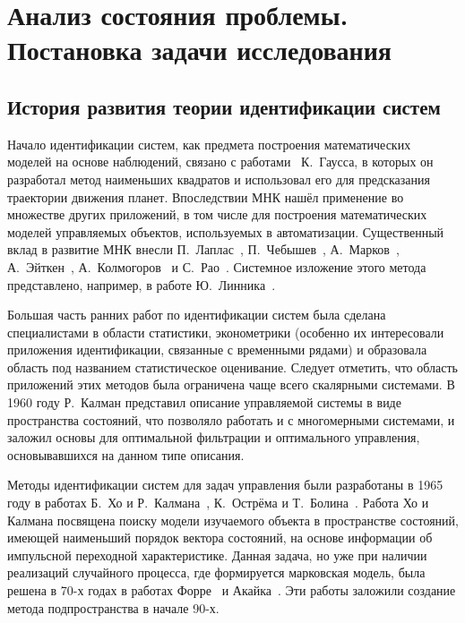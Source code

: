\chapter[Анализ состояния проблемы. Постановка задачи исследования]{%
  Анализ состояния проблемы. \hspace{2cm}
  Постановка задачи исследования
}

\section[История развития теории идентификации систем]{%
  История развития теории идентификации систем
}

Начало идентификации систем, как предмета построения математических моделей на основе наблюдений,
связано с работами~\cite{gauss_1809, gauss_1810, gauss_1821} К.~Гаусса,
в которых он разработал метод наименьших квадратов и использовал его для предсказания
траектории движения планет.
Впоследствии МНК нашёл применение во множестве других приложений,
в том числе для построения математических моделей управляемых объектов,
используемых в автоматизации.
Существенный вклад в развитие МНК внесли
П.~Лаплас~\cite{laplace_1812},
П.~Чебышев~\cite{chebyshev_1859},
А.~Марков~\cite{markov_1898},
А.~Эйткен~\cite{aitken_1935},
А.~Колмогоров~\cite{kolmogorov_1946} и
С.~Рао~\cite{rao_1946}.
Системное изложение этого метода представлено, например, в работе Ю.~Линника~\cite{linnik62}.

Большая часть ранних работ по идентификации систем была сделана специалистами в области статистики,
эконометрики (особенно их интересовали приложения идентификации, связанные с временными рядами) и
образовала область под названием статистическое оценивание.
Следует отметить, что область приложений этих методов была ограничена чаще всего скалярными системами.
В 1960 году Р.~Калман представил описание управляемой системы в виде пространства состояний,
что позволяло работать и с многомерными системами,
и заложил основы для оптимальной фильтрации и оптимального управления,
основывавшихся на данном типе описания.

Методы идентификации систем для задач управления были разработаны в 1965 году в работах
Б.~Хо и Р.~Калмана~\cite{ho_1965}, К.~Острёма и Т.~Болина~\cite{astrom_1965}.
Работа Хо и Калмана посвящена поиску модели изучаемого объекта в пространстве состояний,
имеющей наименьший порядок вектора состояний,
на основе информации об импульсной переходной характеристике.
Данная задача, но уже при наличии реализаций случайного процесса, где формируется марковская модель,
была решена в 70-х годах в работах Форре~\cite{faurre_1973} и Акайка~\cite{akaike_1974}.
Эти работы заложили создание метода подпространства в начале 90-х.


